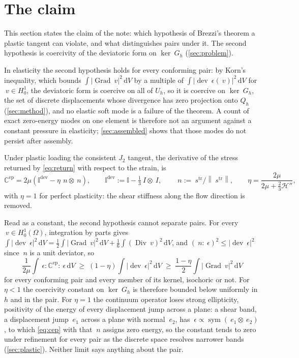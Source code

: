 \documentclass{article}
\newcommand{\Id}{~I}
\newcommand{\eps}{~\epsilon}
\newcommand{\sdev}{~s}
\newcommand{\Grad}{\operatorname{Grad}}
\newcommand{\Div}{\operatorname{Div}}
\newcommand{\dev}{\operatorname{dev}}
\newcommand{\sym}{\operatorname{sym}}
\newcommand{\norm}[1]{\left\lVert #1 \right\rVert}
\newcommand{\diff}{\,\mathrm{d}}
\newcommand{\supdev}{^{\mathrm{dev}}}
\theoremstyle{definition}
\theoremstyle{plain}
\begin{document}
\section{The claim}
\label{sec:prediction}

This section states the claim of the note: which hypothesis of Brezzi's
theorem a plastic tangent can violate, and what distinguishes pairs under it.
The second hypothesis is coercivity of the deviatoric form on $\ker ~G_h$
(\cref{sec:problem}).

In elasticity the second hypothesis holds for every conforming pair: by
Korn's inequality, which bounds $\int \lvert\Grad ~v\rvert^2 \diff V$ by a
multiple of $\int \lvert\dev\eps(~v)\rvert^2 \diff V$ for $~v \in H^1_0$,
the deviatoric form is coercive on all of $U_h$, so it is coercive on
$\ker ~G_h$, the set of discrete displacements whose divergence has zero
projection onto $Q_h$ (\cref{sec:method}), and no elastic soft mode is a
failure of the theorem.
A count of exact zero-energy modes on one element is therefore not an argument
against a constant pressure in elasticity; \cref{sec:assembled} shows that
those modes do not persist after assembly.

Under plastic loading the consistent $J_2$ tangent, the derivative of the
stress returned by \eqref{eq:return} with respect to the strain, is
\begin{equation}
  \label{eq:cep}
  \mathbb{C}^{\mathrm{ep}} = 2\mu \left( \mathbb{I}\supdev - \eta\, ~n \otimes ~n \right),
  \qquad
  \mathbb{I}\supdev := \mathbb{I} - \tfrac13 \Id \otimes \Id,
  \qquad
  ~n := \sdev^{\mathrm{tr}} / \norm{\sdev^{\mathrm{tr}}},
  \qquad
  \eta = \frac{2\mu}{2\mu + \tfrac{2}{3}\mathcal{H}''} ,
\end{equation}
with $\eta = 1$ for perfect plasticity: the shear stiffness along the flow
direction is removed.

Read as a constant, the second hypothesis cannot separate pairs. For every $~v \in H^1_0(\Omega)$,
integration by parts gives $\int \lvert\dev\eps\rvert^2 \diff V =
\tfrac12 \int \lvert\Grad ~v\rvert^2 \diff V + \tfrac16 \int (\Div ~v)^2
\diff V$, and $(~n : \eps)^2 \le \lvert\dev\eps\rvert^2$ since $~n$ is a
unit deviator, so
\begin{equation}
  \label{eq:floor}
  \frac{1}{2\mu} \int \eps : \mathbb{C}^{\mathrm{ep}} : \eps \diff V
  \;\ge\; (1 - \eta) \int \lvert\dev\eps\rvert^2 \diff V
  \;\ge\; \frac{1 - \eta}{2} \int \lvert\Grad ~v\rvert^2 \diff V
\end{equation}
for every conforming pair and every member of its kernel, isochoric or not.
For $\eta < 1$ the coercivity constant on $\ker ~G_h$ is therefore bounded
below uniformly in $h$ and in the pair. For $\eta = 1$ the continuum
operator loses strong ellipticity, positivity of the energy of every
displacement jump across a plane: a shear band, a displacement jump
$~e_1$ across a plane with normal $~e_2$, has $\eps \propto \sym(~e_1 \otimes ~e_2)$, to which \eqref{eq:cep} with
that $~n$ assigns zero energy, so the constant tends to zero under refinement for
every pair as the discrete space resolves narrower bands
(\cref{sec:plastic}). Neither limit says anything about the pair.
\end{document}
